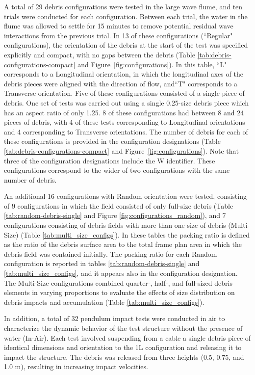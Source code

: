 \documentclass[10pt,a4paper]{article}
\begin{document}
A total of 29 debris configurations were tested in the large wave flume, and ten trials were conducted for each configuration. Between each trial, the water in the flume was allowed to settle for 15 minutes to remove potential residual wave interactions from the previous trial. In 13 of these configurations (``Regular" configurations), the orientation of the debris at the start of the test was specified explicitly and compact, with no gaps between the debris (Table \ref{tab:debris-configurations-compact} and Figure~\ref{fig:configurations}). In this table, ``L" corresponds to a Longitudinal orientation, in which the longitudinal axes of the debris pieces were aligned with the direction of flow, and``T" corresponds to a Transverse orientation. Five of these configurations consisted of  a single piece of debris. One set of tests was carried out using a single 0.25-size debris piece which has an aspect ratio of only 1.25. 8 of these configurations had between 8 and 24 pieces of debris, with 4 of these tests corresponding to Longitudinal orientations and 4 corresponding to Transverse orientations. The number of debris for each of these configurations is provided in the configuration designations (Table \ref{tab:debris-configurations-compact} and Figure~\ref{fig:configurations}). Note that three of the configuration designations include the W identifier. These configurations correspond to the wider of two configurations with the same number of debris. 

An additional 16 configurations with Random orientation were tested, consisting of 9 configurations in which the field consisted of only full-size debris (Table \ref{tab:random-debris-single} and Figure \ref{fig:configurations_random}), and 7 configurations consisting of debris fields with more than one size of debris (Multi-Size) (Table \ref{tab:multi_size_configs}). In these tables the packing ratio is defined as the ratio of the debris surface area to the total frame plan area in which the debris field was contained initially. The packing ratio for each Random configuration is reported in tables \ref{tab:random-debris-single} and \ref{tab:multi_size_configs}, and it appears also in the configuration designation. The Multi-Size configurations combined quarter-, half-, and full-sized debris elements in varying proportions to evaluate the effects of size distribution on debris impacts and accumulation (Table \ref{tab:multi_size_configs}). 

In addition, a total of 32 pendulum impact tests were conducted in air to characterize the dynamic behavior of the test structure without the presence of water (In-Air). Each test involved suspending from a cable a single debris piece of identical dimensions and orientation to the 1L configuration and releasing it to impact the structure. The debris was released from three heights (0.5, 0.75, and 1.0 m), resulting in increasing impact velocities.
\end{document}
